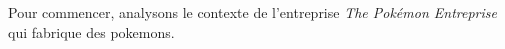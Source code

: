 \documentclass[../main.tex]{subfiles}
\begin{document}
    Pour commencer, analysons le contexte de l'entreprise \emph{The Pokémon Entreprise} qui fabrique des \glspl{pokemon}. \\

    
    
    
    
\end{document}
